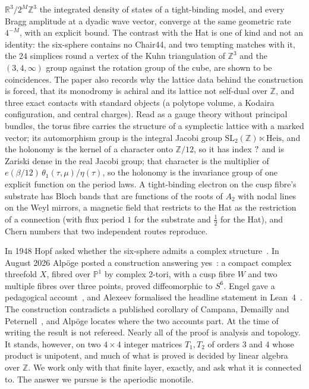 \documentclass[11pt,a4paper]{article}
\newcommand{\ZZ}{\mathbb{Z}}
\newcommand{\RR}{\mathbb{R}}
\newcommand{\SL}{\mathrm{SL}}
\theoremstyle{plain}
\theoremstyle{definition}
\begin{document}
$\RR^3/2^M\ZZ^3$ the integrated density of states of a tight-binding model, and every Bragg amplitude at a dyadic wave
vector, converge at the same geometric rate $4^{-M}$, with an explicit bound. The contrast with the Hat is one of kind and not an identity:
the six-sphere contains no Chair44, and two tempting matches with it, the $24$ simplices
round a vertex of the Kuhn triangulation of $\ZZ^3$ and the $(3,4,\infty)$ group against
the rotation group of the cube, are shown to be coincidences.
The paper also records why the lattice data
behind the construction is forced, that its monodromy is achiral and its
lattice not self-dual over $\ZZ$, and three exact contacts with standard
objects (a polytope volume, a Kodaira configuration, and central charges).
Read as a gauge theory without principal bundles, the torus fibre carries the structure of a symplectic lattice with
a marked vector; its automorphism group is the integral Jacobi group $\SL_2(\ZZ)\ltimes\mathrm{Heis}$, and the
holonomy is the kernel of a character onto $\ZZ/12$, so it has index $?$ and is Zariski dense in
the real Jacobi group; that character is the multiplier of $e(\beta/12)\,\theta_1(\tau,\mu)/\eta(\tau)$, so the holonomy is the
invariance group of one explicit function on the period laws. A tight-binding electron on the cusp fibre's substrate has Bloch bands that are
functions of the roots of $A_2$ with nodal lines on the Weyl mirrors, a magnetic field that restricts to the Hat as the
restriction of a connection (with flux period $1$ for the substrate and $\tfrac12$ for the Hat), and Chern numbers
that two independent routes reproduce.

In 1948 Hopf asked whether the six-sphere admits a complex
structure~\cite{Hopf48}. In August 2026 Alpöge posted a construction
answering yes~\cite{Alpoge}: a compact complex threefold $X$, fibred over
$\mathbb{P}^1$ by complex 2-tori, with a cusp fibre $W$ and two multiple
fibres over three points, proved diffeomorphic to $S^6$. Engel gave a
pedagogical account~\cite{Engel}, and Alexeev formalised the headline
statement in Lean~4~\cite{Alexeev}. The construction contradicts a published
corollary of Campana, Demailly and Peternell~\cite{CDP20}, and Alpöge locates
where the two accounts part. At the time of writing the result is not
refereed.
Nearly all of the proof is analysis and topology. It stands, however, on two
$4\times4$ integer matrices $T_1,T_2$ of orders $3$ and $4$ whose product is
unipotent, and much of what is proved is decided by linear algebra over $\ZZ$.
We work only with that finite layer, exactly, and ask what it is connected to.
The answer we pursue is the aperiodic monotile.
\end{document}
